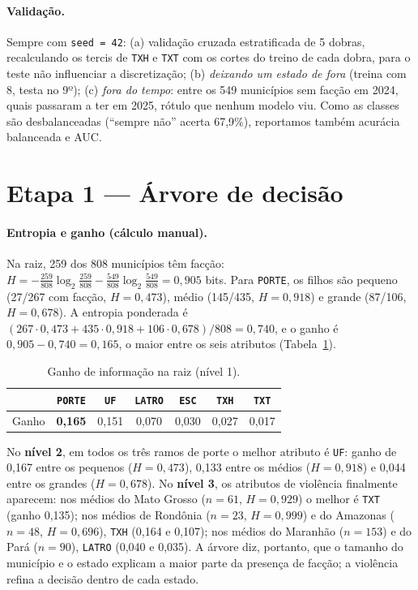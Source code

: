 \documentclass[10pt,a4paper,twocolumn]{article}
\begin{document}
\paragraph{Validação.} Sempre com \texttt{seed = 42}: (a) validação cruzada estratificada
de 5 dobras, recalculando os tercis de \texttt{TXH} e \texttt{TXT} com os cortes do treino
de cada dobra, para o teste não influenciar a discretização; (b) \emph{deixando um estado
de fora} (treina com 8, testa no 9º); (c) \emph{fora do tempo}: entre os 549 municípios sem
facção em 2024, quais passaram a ter em 2025, rótulo que nenhum modelo viu. Como as classes
são desbalanceadas (``sempre não'' acerta 67,9\%), reportamos também acurácia balanceada e
AUC.

\section{Etapa 1 --- Árvore de decisão}

\paragraph{Entropia e ganho (cálculo manual).} Na raiz, 259 dos 808 municípios têm facção:
$H=-\frac{259}{808}\log_2\frac{259}{808}-\frac{549}{808}\log_2\frac{549}{808}=0{,}905$
bits. Para \texttt{PORTE}, os filhos são pequeno (27/267 com facção, $H=0{,}473$), médio
(145/435, $H=0{,}918$) e grande (87/106, $H=0{,}678$). A entropia ponderada é
$(267\cdot0{,}473+435\cdot0{,}918+106\cdot0{,}678)/808=0{,}740$, e o ganho é
$0{,}905-0{,}740=0{,}165$, o maior entre os seis atributos (Tabela~\ref{tab:ganho}).

\begin{table}[t]
\centering\small
\begin{tabular}{@{}lcccccc@{}}
\toprule
& \texttt{PORTE} & \texttt{UF} & \texttt{LATRO} & \texttt{ESC} & \texttt{TXH} & \texttt{TXT}\\
\midrule
Ganho & \textbf{0,165} & 0,151 & 0,070 & 0,030 & 0,027 & 0,017\\
\bottomrule
\end{tabular}
\caption{Ganho de informação na raiz (nível 1).}\label{tab:ganho}
\end{table}

No \textbf{nível 2}, em todos os três ramos de porte o melhor atributo é \texttt{UF}: ganho
de 0,167 entre os pequenos ($H=0{,}473$), 0,133 entre os médios ($H=0{,}918$) e 0,044 entre
os grandes ($H=0{,}678$). No \textbf{nível 3}, os atributos de violência finalmente
aparecem: nos médios do Mato Grosso ($n=61$, $H=0{,}929$) o melhor é \texttt{TXT} (ganho
0,135); nos médios de Rondônia ($n=23$, $H=0{,}999$) e do Amazonas ($n=48$, $H=0{,}696$),
\texttt{TXH} (0,164 e 0,107); nos médios do Maranhão ($n=153$) e do Pará ($n=90$),
\texttt{LATRO} (0,040 e 0,035). A árvore diz, portanto, que o tamanho do município e o
estado explicam a maior parte da presença de facção; a violência refina a decisão dentro de
cada estado.
\end{document}
